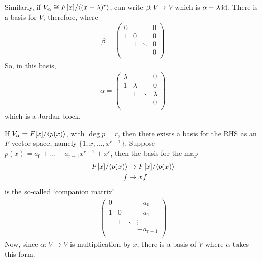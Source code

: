 \documentclass{../../template/note}
\begin{document}
    \begin{example*}
        Similarly, if $V_\alpha \cong F[x]/\!\left \langle (x-\lambda)^r \right \rangle$, can write $\beta: V \to V$ which is $\alpha-\lambda\operatorname{id}$. There is a basis for $V$, therefore, where
        \begin{align*}
            \beta = \begin{pmatrix}
                0 &  &  & 0 \\
                1 & 0 &  & 0 \\
                 & 1 & \ddots & 0 \\
                 &  &  & 0 \\
            \end{pmatrix}
        \end{align*}
        So, in this basis,
        \begin{align*}
            \alpha = \begin{pmatrix}
                \lambda &  &  & 0 \\
                1 & \lambda &  & 0 \\
                 & 1 & \ddots & \lambda \\
                 &  &  & 0 \\
            \end{pmatrix}
        \end{align*}
        which is a Jordan block.
    \end{example*}
    
    \begin{example*}
        If $V_\alpha = F[x]/\!\left \langle p(x) \right \rangle$, with $\deg p = r$, then there exists a basis for the RHS as an $F$-vector space, namely $\{1, x, \dots, x^{r-1}\}$. Suppose $p(x) = a_0 + \dots + a_{r-1}x^{r-1} + x^r$, then the basis for the map
        \begin{align*}
            F[x]/\!\left \langle p(x) \right \rangle &\to F[x]/\!\left \langle p(x) \right \rangle \\
            f &\mapsto xf
        \end{align*}
        is the so-called `companion matrix'
        \begin{align*}
            \begin{pmatrix}
                0 &  &  & -a_0 \\
                1 & 0 &  & -a_1\\
                 & 1 & \ddots & \vdots \\
                 &  &  & -a_{r-1} \\
            \end{pmatrix}
        \end{align*}
        Now, since $\alpha: V \to V$ is multiplication by $x$, there is a basis of $V$ where $\alpha$ takes this form.
    \end{example*}
    
\end{document}

